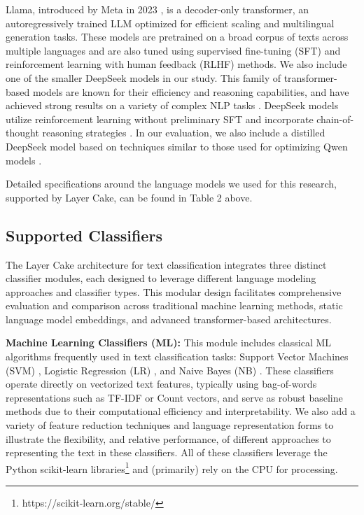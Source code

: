 \documentclass[final]{clv2025-revised}
\begin{document}
Llama, introduced by Meta in 2023 \cite{touvron2023llama}, is a decoder-only transformer, an autoregressively trained LLM optimized for efficient scaling and multilingual generation tasks. These models are pretrained on a broad corpus of texts across multiple languages and are also tuned using supervised fine-tuning (SFT) and reinforcement learning with human feedback (RLHF) methods. We also include one of the smaller DeepSeek models in our study. This family of transformer-based models are known for their efficiency and reasoning capabilities, and have achieved strong results on a variety of complex NLP tasks \cite{articlebi, guo2025deepseek}. DeepSeek models utilize reinforcement learning without preliminary SFT \cite{ouyang2022training} and incorporate chain-of-thought reasoning strategies \cite{articlewei}. In our evaluation, we also include a distilled DeepSeek model based on techniques similar to those used for optimizing Qwen models \cite{articlebai, hinton2015distilling}.

Detailed specifications around the language models we used for this research, supported by Layer Cake, can be found in Table 2 above.

\subsection{Supported Classifiers}

The Layer Cake architecture for text classification integrates three distinct classifier modules, each designed to leverage different language modeling approaches and classifier types. This modular design facilitates comprehensive evaluation and comparison across traditional machine learning methods, static language model embeddings, and advanced transformer-based architectures.

\textbf{Machine Learning Classifiers (ML):} This module includes classical ML algorithms frequently used in text classification tasks: Support Vector Machines (SVM) \cite{joachims1998text}, Logistic Regression (LR) \cite{genkin01082007}, and Naive Bayes (NB) \cite{mccallum1998comparison}. These classifiers operate directly on vectorized text features, typically using bag-of-words representations such as TF-IDF or Count vectors, and serve as robust baseline methods due to their computational efficiency and interpretability. We also add a variety of feature reduction techniques and language representation forms to illustrate the flexibility, and relative performance, of different approaches to representing the text in these classifiers. All of these classifiers leverage the Python scikit-learn libraries\footnote{https://scikit-learn.org/stable/} and (primarily) rely on the CPU for processing.
\end{document}
